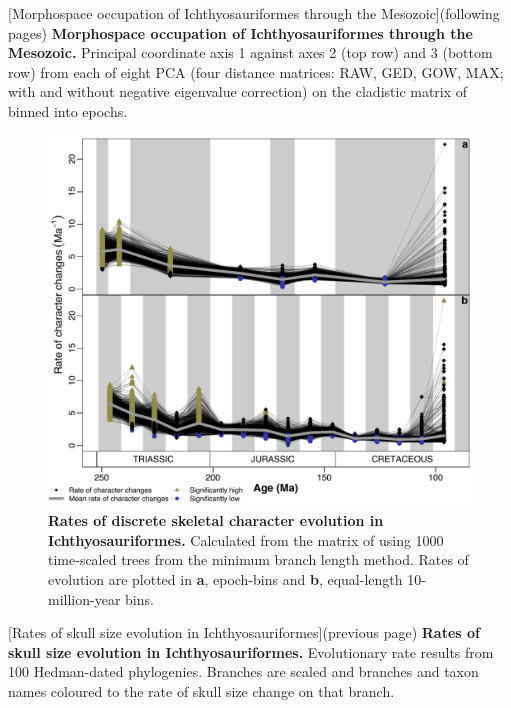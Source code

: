 \documentclass[british,a4paper]{article}
\begin{document}
[Morphospace occupation of Ichthyosauriformes through the
    Mesozoic]{(following pages) \textbf{Morphospace occupation of
    Ichthyosauriformes through the Mesozoic.} Principal coordinate axis 1
    against axes 2 (top row) and 3 (bottom row) from each of eight PCA (four
    distance matrices: RAW, GED, GOW, MAX\@; with and without negative eigenvalue
    correction) on the cladistic matrix of \textcite{Moon2018JSP} binned into
    epochs.\label{fig:morphospace-plots}}


\begin{figure}[h]
    \includegraphics[width = \textwidth, center]{supp_figures/figS8-rates_MBLspaghetti}
    \caption[Rates of discrete skeletal character evolution in
    Ichthyosauriformes]{\textbf{Rates of discrete skeletal character evolution in
    Ichthyosauriformes.} Calculated from the matrix of \textcite{Moon2018JSP} using
    1000 time-scaled trees from the minimum branch length method. Rates of evolution
    are plotted in \textbf{a}, epoch-bins and \textbf{b}, equal-length
    10-million-year bins.\label{fig:mbl-discrete-rates}}
\end{figure}
 
[Rates of skull size evolution in Ichthyosauriformes]{(previous
    page) \textbf{Rates of skull size evolution in Ichthyosauriformes.}
    Evolutionary rate results from 100 Hedman-dated phylogenies. Branches are scaled
    and branches and taxon names coloured to the rate of skull size change on that
    branch.} 

\end{document}
